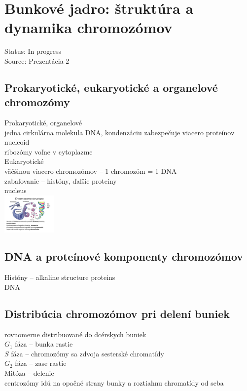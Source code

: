 \section{Bunkové jadro: štruktúra a dynamika chromozómov}
Status: In progress\\
Source: Prezentácia 2\\

\subsection{Prokaryotické, eukaryotické a organelové chromozómy}
Prokaryotické, organelové\\
\tab jedna cirkulárna molekula DNA, kondenzáciu zabezpečuje viacero proteínov\\
\tab nucleoid\\
\tab ribozómy voľne v cytoplazme\\
Eukaryotické\\
\tab väčšinou viacero chromozómov -- 1 chromozóm = 1 DNA\\
\tab zabaľovanie -- históny, ďalšie proteíny\\
\tab nucleus\\
\includegraphics[width=0.2\textwidth]{images/bunkova_bio/chromosome_dna}\\

\subsection{DNA a proteínové komponenty chromozómov}
Históny -- alkaline structure proteins\\
DNA\\
\subsection{Distribúcia chromozómov pri delení buniek}
rovnomerne distribuované do dcérskych buniek\\
$G_1$ fáza -- bunka rastie\\
$S$ fáza -- chromozómy sa zdvoja \ra sesterské chromatídy\\
$G_2$ fáza -- zase rastie\\
Mitóza -- delenie\\
\tab centrozómy idú na opačné strany bunky a roztiahnu chromatídy od seba\\
